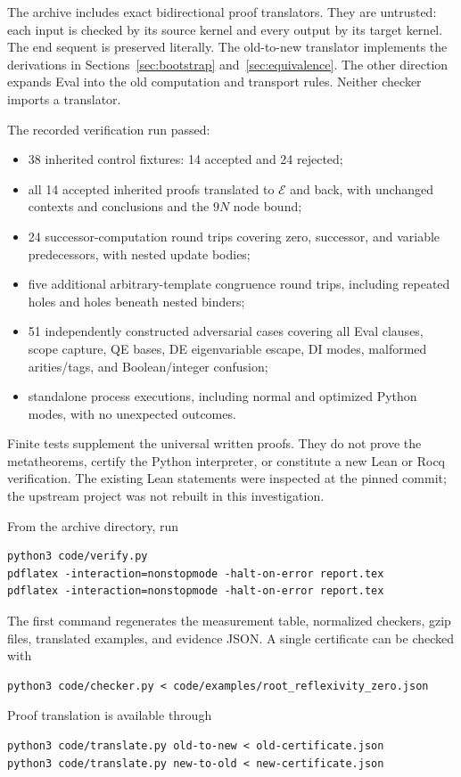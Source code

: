 \documentclass[11pt]{article}
\theoremstyle{definition}
\newcommand{\E}{\mathcal E}
\begin{document}
The archive includes exact bidirectional proof translators. They are
untrusted: each input is checked by its source kernel and every output by
its target kernel. The end sequent is preserved literally. The old-to-new
translator implements the derivations in Sections~\ref{sec:bootstrap}
and~\ref{sec:equivalence}. The other direction expands Eval into the
old computation and transport rules. Neither checker imports a translator.

The recorded verification run passed:
\begin{itemize}
\item 38 inherited control fixtures: 14 accepted and 24 rejected;
\item all 14 accepted inherited proofs translated to $\E$ and back,
      with unchanged contexts and conclusions and the $9N$ node bound;
\item 24 successor-computation round trips covering zero, successor,
      and variable predecessors, with nested update bodies;
\item five additional arbitrary-template congruence round trips,
      including repeated holes and holes beneath nested binders;
\item 51 independently constructed adversarial cases covering all Eval
      clauses, scope capture, QE bases, DE eigenvariable escape, DI modes,
      malformed arities/tags, and Boolean/integer confusion;
\item \clicount{} standalone process executions, including normal and
      optimized Python modes, with no unexpected outcomes.
\end{itemize}

Finite tests supplement the universal written proofs. They do not prove
the metatheorems, certify the Python interpreter, or constitute a new Lean
or Rocq verification. The existing Lean statements were inspected at the
pinned commit; the upstream project was not rebuilt in this investigation.

\par\noindent
\begin{minipage}{\linewidth}
From the archive directory, run
\begin{verbatim}
python3 code/verify.py
pdflatex -interaction=nonstopmode -halt-on-error report.tex
pdflatex -interaction=nonstopmode -halt-on-error report.tex
\end{verbatim}
\end{minipage}
\par
The first command regenerates the measurement table, normalized checkers,
gzip files, translated examples, and evidence JSON. A single certificate
can be checked with
\begin{verbatim}
python3 code/checker.py < code/examples/root_reflexivity_zero.json
\end{verbatim}
Proof translation is available through
\begin{verbatim}
python3 code/translate.py old-to-new < old-certificate.json
python3 code/translate.py new-to-old < new-certificate.json
\end{verbatim}
\end{document}
